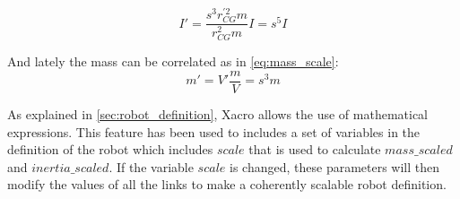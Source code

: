 \begin{equation}
\label{eq:inertia_scale}
  I' = \frac{s^{3} r_{CG}^{'2} m}{r_{CG}^{2} m} I = s^{5} I
\end{equation}

And lately the mass can be correlated as in \ref{eq:mass_scale}:
\begin{equation}
\label{eq:mass_scale}
  m' = V' \frac{m}{V} = s^{3}m
\end{equation}

As explained in \ref{sec:robot_definition}, Xacro allows the use of mathematical expressions. 
This feature has been used to includes a set of variables in the definition of the robot which includes $scale$ that is used to calculate $mass\_scaled$ and $inertia\_scaled$.
If the variable $scale$ is changed, these parameters will then modify the values of all the links to make a coherently scalable robot definition.

